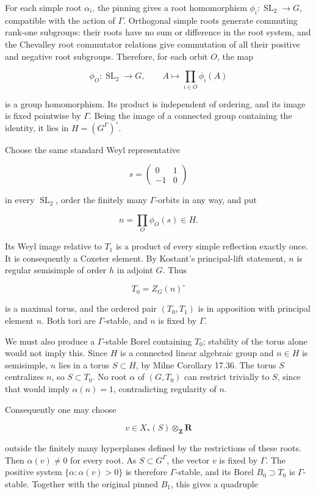 \documentclass[11pt,a4paper]{article}
\theoremstyle{definition}\newtheorem{definition}[theorem]{Definition}
\theoremstyle{remark}\newtheorem{remark}[theorem]{Remark}
\begin{document}
For each simple root \(\alpha_i\), the pinning gives a root homomorphism
\(\phi_i:\operatorname{SL}_2\to G\), compatible with the action of
\(\Gamma\). Orthogonal simple roots generate commuting rank-one
subgroups: their roots have no sum or difference in the root system, and
the Chevalley root commutator relations give commutation of all their
positive and negative root subgroups. Therefore, for each orbit \(O\),
the map

\[
 \phi_O:\operatorname{SL}_2\longrightarrow G,\qquad
 A\longmapsto\prod_{i\in O}\phi_i(A)
\]

is a group homomorphism. Its product is independent of ordering, and its
image is fixed pointwise by \(\Gamma\). Being the image of a connected
group containing the identity, it lies in \(H=(G^\Gamma)^\circ\).

Choose the same standard Weyl representative

\[
 s=\begin{pmatrix}0&1\\-1&0\end{pmatrix}
\]

in every \(\operatorname{SL}_2\), order the finitely many
\(\Gamma\)-orbits in any way, and put

\[
 n=\prod_O\phi_O(s)\in H.
 \tag{CC-APG.15}
\]

Its Weyl image relative to \(T_1\) is a product of every simple
reflection exactly once. It is consequently a Coxeter element. By
Kostant's principal-lift statement, \(n\) is regular semisimple of order
\(h\) in adjoint \(G\). Thus

\[
 T_0=Z_G(n)^\circ
\]

is a maximal torus, and the ordered pair \((T_0,T_1)\) is in apposition
with principal element \(n\). Both tori are \(\Gamma\)-stable, and \(n\)
is fixed by \(\Gamma\).

We must also produce a \(\Gamma\)-stable Borel containing \(T_0\);
stability of the torus alone would not imply this. Since \(H\) is a
connected linear algebraic group and \(n\in H\) is semisimple, \(n\)
lies in a torus \(S\subset H\), by Milne Corollary 17.36. The torus
\(S\) centralizes \(n\), so \(S\subset T_0\). No root \(\alpha\) of
\((G,T_0)\) can restrict trivially to \(S\), since that would imply
\(\alpha(n)=1\), contradicting regularity of \(n\).

Consequently one may choose

\[
 v\in X_*(S)\otimes_{\mathbf Z}\mathbf R
\]

outside the finitely many hyperplanes defined by the restrictions of
these roots. Then \(\alpha(v)\ne0\) for every root. As
\(S\subset G^\Gamma\), the vector \(v\) is fixed by \(\Gamma\). The
positive system \(\{\alpha:\alpha(v)>0\}\) is therefore
\(\Gamma\)-stable, and its Borel \(B_0\supset T_0\) is
\(\Gamma\)-stable. Together with the original pinned \(B_1\), this gives
a quadruple
\end{document}
